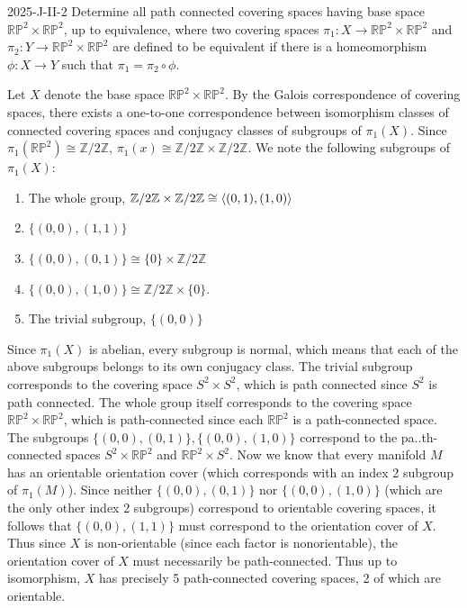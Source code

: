 \documentclass{article}
\begin{document}
	\begin{prb}{2025-J-II-2}
		Determine all path connected covering spaces having base space $\mathbb{RP}^2 \times \mathbb{RP}^2$, up to equivalence, where two covering spaces $\pi_1: X \to \mathbb{RP}^2 \times \mathbb{RP}^2$ and $\pi_2: Y \to \mathbb{RP}^2 \times \mathbb{RP}^2$ are defined to be equivalent if there is a homeomorphism $\phi: X \to Y$ such that $\pi_1 = \pi_2 \circ \phi$. 
	\end{prb}
	Let $X$ denote the base space $\mathbb{RP}^2 \times \mathbb{RP}^2$. By the Galois correspondence of covering spaces, there exists a one-to-one correspondence between isomorphism classes of connected covering spaces and conjugacy classes of subgroups of $\pi_1(X)$. Since $\pi_1(\mathbb{RP}^2) \cong \mathbb{Z}/2\mathbb{Z}$, $\pi_1(x) \cong \mathbb{Z}/2\mathbb{Z} \times \mathbb{Z}/2\mathbb{Z}$. We note the following subgroups of $\pi_1(X)$: 
	\begin{enumerate}[itemsep =-2pt,label = (\arabic{*})]
		\item The whole group, $\mathbb{Z}/2\mathbb{Z} \times \mathbb{Z}/2\mathbb{Z} \cong \braket{(0,1),(1,0)}$ 
		\item $\{(0,0), (1,1)\}$
		\item $\{(0,0), (0,1)\} \cong \{0\} \times \mathbb{Z}/2\mathbb{Z}$ 
		\item $\{(0,0), (1,0)\} \cong \mathbb{Z}/2\mathbb{Z} \times \{0\}$. 
		\item The trivial subgroup, $\{(0,0)\}$
	\end{enumerate}
	Since $\pi_1(X)$ is abelian, every subgroup is normal, which means that each of the above subgroups belongs to its own conjugacy class. The trivial subgroup corresponds to the covering space $S^2 \times S^2$, which is path connected since $S^2$ is path connected. The whole group itself corresponds to the covering space $\mathbb{RP}^2 \times \mathbb{RP}^2$, which is path-connected since each $\mathbb{RP}^2$ is a path-connected space. The subgroups $\{(0,0), (0,1)\}, \{(0,0),(1,0)\}$ correspond to the pa..th-connected spaces $S^2 \times \mathbb{RP}^2$ and $\mathbb{RP}^2 \times S^2$. Now we know that every manifold $M$ has an orientable orientation cover (which corresponds with an index 2 subgroup of $\pi_1(M)$). Since neither $\{(0,0), (0,1)\}$ nor $\{(0,0), (1,0)\}$ (which are the only other index 2 subgroups) correspond to orientable covering spaces, it follows that $\{(0,0), (1,1)\}$ must correspond to the orientation cover of $X$. Thus since $X$ is non-orientable (since each factor is nonorientable), the orientation cover of $X$ must necessarily be path-connected. Thus up to isomorphism, $X$ has precisely 5 path-connected covering spaces, 2 of which are orientable. 
	
\end{document}
